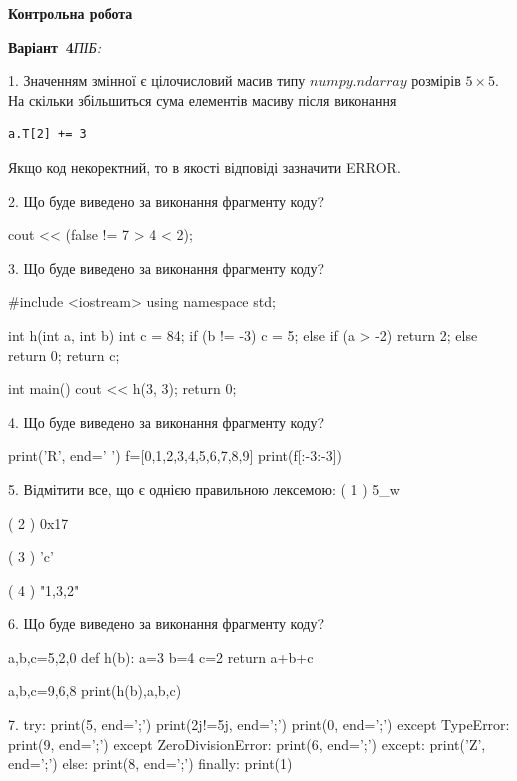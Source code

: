 \documentclass[11pt]{article}
\begin{document}
{\large\textbf{Контрольна робота}}

\textbf{Варіант \No\,4}\hfill \textit{ПІБ:}\,\underline{\hspace{60mm}}
\vspace{4mm}

1. 
Значенням змінної  є цілочисловий масив типу $numpy.ndarray$ розмірів $5{\times}5$. На скільки збільшиться сума елементів масиву  після виконання
\begin{verbatim}
a.T[2] += 3
\end{verbatim}


Якщо код некоректний, то в якості відповіді зазначити ERROR.




2. Що буде виведено за виконання фрагменту коду?

cout << (false != 7 > 4 < 2);


3. Що буде виведено за виконання фрагменту коду?

#include <iostream>
using namespace std;

int h(int a, int b){
    int c = 84;
    if (b != -3)
        c = 5;
    else if (a > -2)
         return 2;
    else 
        return 0;
    return c;
}

int main(){
    cout << h(3, 3);
    return 0;
}


4. Що буде виведено за виконання фрагменту коду?

print('R', end=' ')
f=[0,1,2,3,4,5,6,7,8,9]
print(f[:-3:-3])



5. %
Відмітити все, що є однією правильною лексемою:
( 1 ) 5_w

( 2 ) 0x17

( 3 ) 'c'

( 4 ) "1,3,2"


6. Що буде виведено за виконання фрагменту коду?

a,b,c=5,2,0
def h(b):
    a=3
    b=4
    c=2
    return a+b+c

a,b,c=9,6,8
print(h(b),a,b,c)


7. 
try:
    print(5, end=';')
    print(2j!=5j, end=';')
    print(0, end=';')
except TypeError:
    print(9, end=';')
except ZeroDivisionError:
    print(6, end=';')
except:
    print('Z', end=';')
else:
    print(8, end=';')
finally:
    print(1)
\end{document}
